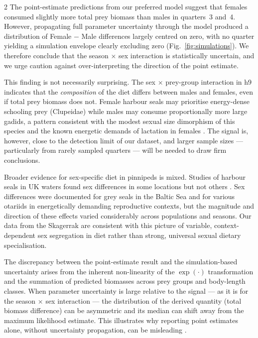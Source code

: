\begin{spacing}{2}
The point-estimate predictions from our preferred model suggest that females
consumed slightly more total prey biomass than males in quarters~3 and~4.
However, propagating full parameter uncertainty through the model produced a
distribution of Female $-$ Male differences largely centred on zero, with no
quarter yielding a simulation envelope clearly excluding zero
(Fig.~\ref{fig:simulations}). We therefore conclude that the season $\times$
sex interaction is statistically uncertain, and we urge caution against
over-interpreting the direction of the point estimate.

This finding is not necessarily surprising. The sex $\times$ prey-group
interaction in h9 indicates that the \textit{composition} of the diet
differs between males and females, even if total prey biomass does not.
Female harbour seals may prioritise energy-dense schooling prey (Clupeidae)
while males may consume proportionally more large gadids, a pattern
consistent with the modest sexual size dimorphism of this species and the
known energetic demands of lactation in females \citep{HansenHarding2006}.
The signal is, however, close to the detection limit of our dataset, and
larger sample sizes --- particularly from rarely sampled quarters --- will
be needed to draw firm conclusions.

Broader evidence for sex-specific diet in pinnipeds is mixed. Studies of
harbour seals in UK waters found sex differences in some locations but not
others \citep{WilsonHammond2016, Conwell2024}. Sex differences were
documented for grey seals in the Baltic Sea \citep{Tverin2019, Lundstrom2010}
and for various otariids in energetically demanding reproductive contexts,
but the magnitude and direction of these effects varied considerably across
populations and seasons. Our data from the Skagerrak are consistent with
this picture of variable, context-dependent sex segregation in diet rather
than strong, universal sexual dietary specialisation.

The discrepancy between the point-estimate result and the simulation-based
uncertainty arises from the inherent non-linearity of the $\exp(\cdot)$
transformation and the summation of predicted biomasses across prey groups
and body-length classes. When parameter uncertainty is large relative to the
signal --- as it is for the season $\times$ sex interaction --- the
distribution of the derived quantity (total biomass difference) can be
asymmetric and its median can shift away from the maximum likelihood
estimate. This illustrates why reporting point estimates alone, without
uncertainty propagation, can be misleading \citep{Anderson2024}.


\end{spacing}
